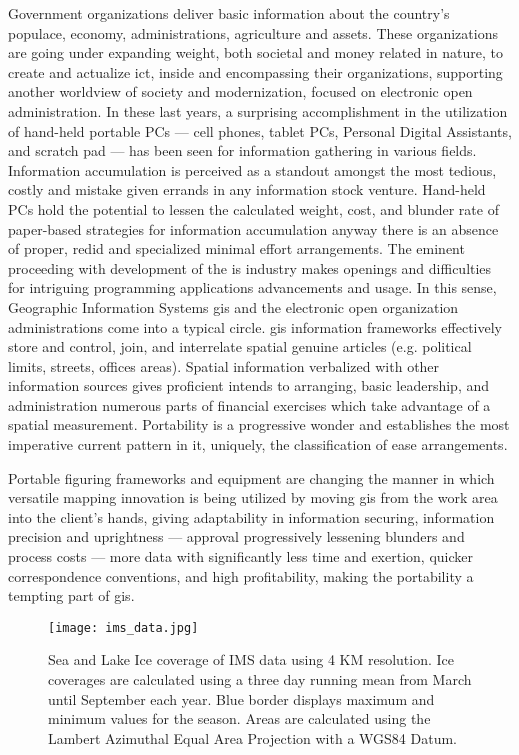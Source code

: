 Government organizations deliver basic information about the country's populace, economy, administrations, agriculture and assets. These organizations are going under expanding weight, both societal and money related in nature, to create and actualize \gls{ict}, inside and encompassing their organizations, supporting another worldview of society and modernization, focused on electronic open administration. In these last years, a surprising accomplishment in the utilization of hand-held portable PCs — cell phones, tablet PCs, Personal Digital Assistants, and scratch pad — has been seen for information gathering in various fields.
Information accumulation is perceived as a standout amongst the most tedious, costly and mistake given errands in any information stock venture. Hand-held PCs hold the potential to lessen the calculated weight, cost, and blunder rate of paper-based strategies for information accumulation anyway there is an absence of proper, redid and specialized minimal effort arrangements. The eminent proceeding with development of the \gls{is} industry makes openings and difficulties for intriguing programming applications advancements and usage. In this sense, Geographic Information Systems \gls{gis} and the electronic open organization administrations come into a typical circle. \gls{gis} information frameworks effectively store and control, join, and interrelate spatial genuine articles (e.g. political limits, streets, offices areas). Spatial information verbalized with other information sources gives proficient intends to arranging, basic leadership, and administration numerous parts of financial exercises which take advantage of a spatial measurement. Portability is a progressive wonder and establishes the most imperative current pattern in \gls{it}, uniquely, the classification of ease arrangements.

Portable figuring frameworks and equipment are changing the manner in which versatile mapping innovation is being utilized by moving \gls{gis} from the work area into the client's hands, giving adaptability in information securing, information precision and uprightness — approval progressively lessening blunders and process costs — more data with significantly less time and exertion, quicker correspondence conventions, and high profitability, making the portability a tempting part of \gls{gis}.

%
\begin{figure}[ht]
  \centering
  \begin{minipage}{4.5in}
    \texttt{[image: ims\_data.jpg]}
    \caption{ \label{fig:nat_ice} Sea and Lake Ice coverage of IMS data using 4 KM resolution. Ice coverages are calculated using a three day running mean from March until September each year. Blue border displays maximum and minimum values for the season. Areas are calculated using the Lambert Azimuthal Equal Area Projection with a WGS84 Datum. \cite{nat_ice}}
  \end{minipage}
\end{figure}
%



